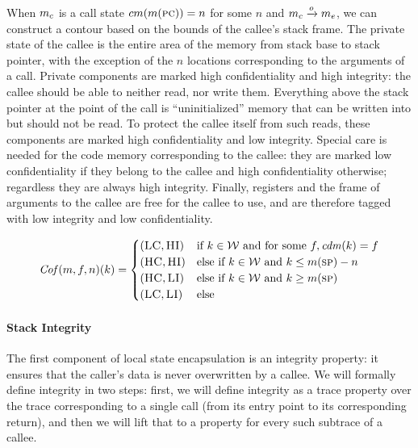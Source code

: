 \documentclass[acmsmall,review,anonymous]{acmart}\settopmatter{printfolios=true,printccs=false,printacmref=false}
\begin{document}
When \(m_c\) is a call state \(cm(m(\textsc{pc})) = n\) for
some \(n\) and \(m_c \xrightarrow{o} m_e\), we can construct
a contour based on the bounds of the callee's stack frame.
%
The private state of the callee is the entire area of the memory from
stack base to stack pointer, with the exception of the $n$ locations
corresponding to the arguments of a call. Private components are
marked high confidentiality and high integrity: the callee should be
able to neither read, nor write them.
%
Everything above the stack pointer at the point of the call is
``uninitialized'' memory that can be written into but should not be
read. To protect the callee itself from such reads, these components
are marked high confidentiality and low integrity.
%
Special care is needed for the code memory corresponding to the
callee: they are marked low confidentiality if they belong to the
callee and high confidentiality otherwise; regardless they are always
high integrity.
%
Finally, registers and the frame of arguments to the callee are free
for the callee to use, and are therefore tagged with low integrity and
low confidentiality.

 \[\mathit{Cof}(m,f,n)(k) =
  \begin{cases}
    (\textsc{LC},\textsc{HI}) & \text{if } k \in {\mathcal W}
                         \text{ and for some } f, \mathit{cdm}(k) = f \\
    (\textsc{HC},\textsc{HI}) & \text{else if } k \in {\mathcal W}
                          \text{ and } k \leq m(\textsc{sp}) - n \\
    (\textsc{HC},\textsc{LI}) & \text{else if } k \in {\mathcal W}
                         \text{ and } k \geq m(\textsc{sp}) \\
    (\textsc{LC},\textsc{LI}) & \text{else} \\
  \end{cases}\]


\paragraph*{Stack Integrity}

The first component of local state encapsulation is an integrity
property: it ensures that the caller's data is never overwritten by a
callee. We will formally define integrity in two steps: first, we will
define integrity as a trace property over the trace corresponding to a
single call (from its entry point to its corresponding return), and
then we will lift that to a property for every such subtrace of a
callee.
\end{document}

